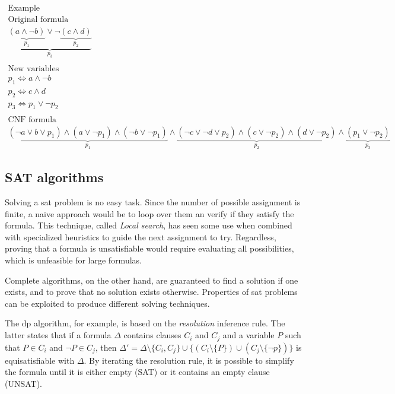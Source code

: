\begin{multline*}
    \text{Example} \\
    \text{Original formula} \\
    \underbrace{\underbrace{(a \land \neg b)}_{p_1} \lor \neg \underbrace{(c \land d)}_{p_2}}_{p_3} \\
    \\
    \text{New variables} \\
    p_1 \iff a \land \neg b \\
    p_2 \iff c \land d \\
    p_3 \iff p_1 \lor \neg p_2 \\
    \\
    \text{CNF formula} \\
    \underbrace{(\neg a \lor b \lor p_1) \land (a \lor \neg p_1) \land (\neg b \lor \neg p_1)}_{p_1} \land \underbrace{(\neg c \lor \neg d \lor p_2) \land (c \lor \neg p_2) \land (d \lor \neg p_2)}_{p_2} \land \underbrace{(p_1 \lor \neg p_2)}_{p_3}
\end{multline*}

\subsection*{SAT algorithms}

Solving a \gls{sat} problem is no easy task.
Since the number of possible assignment is finite, a naive approach would be to loop over them an verify if they satisfy the formula.
This technique, called \textit{Local search}, has seen some use when combined with specialized heuristics to guide the next assignment to try.
Regardless, proving that a formula is unsatisfiable would require evaluating all possibilities, which is unfeasible for large formulas.

Complete algorithms, on the other hand, are guaranteed to find a solution if one exists, and to prove that no solution exists otherwise.
Properties of \gls{sat} problems can be exploited to produce different solving techniques.

The \gls{dp} algorithm, for example, is based on the \textit{resolution} inference rule.
The latter states that if a formula $\Delta$ contains clauses $C_i$ and $C_j$ and a variable $P$ such that $P \in C_i$ and $\neg P \in C_j$, then $\Delta' = \Delta \setminus \{ C_i, C_j \} \cup \{(C_i \setminus \{ P \}) \cup (C_j \setminus \{\neg p\})\}$ is equisatisfiable with $\Delta$.
By iterating the resolution rule, it is possible to simplify the formula until it is either empty (SAT) or it contains an empty clause (UNSAT).


